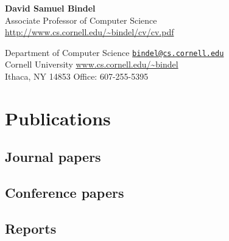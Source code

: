 \documentclass{article}
\begin{document}
\begin{center}
  {\Large \bf David Samuel Bindel} \\
  Associate Professor of Computer Science \\
  \url{http://www.cs.cornell.edu/~bindel/cv/cv.pdf}
\end{center}

\begin{trivlist}
\item
Department of Computer Science
  \hfill \href{mail:bindel@cs.cornell.edu}{\tt bindel@cs.cornell.edu} \\
Cornell University
  \hfill \url{www.cs.cornell.edu/~bindel} \\
Ithaca, NY 14853
  \hfill Office: 607-255-5395
\end{trivlist}


\section*{Publications}

\subsection*{Journal papers}



\subsection*{Conference papers}



\subsection*{Reports}


\end{document}
